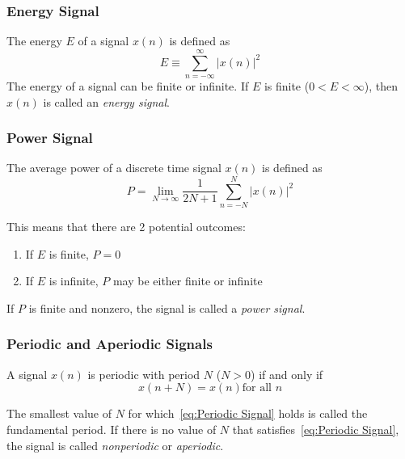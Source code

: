 \subsubsection{Energy Signal}\label{subsubsec:Energy Signal}
\begin{definition}\label{def:Energy Signal}
  The energy $E$ of a signal $x(n)$ is defined as
  \begin{equation}\label{eq:Energy Signal}
    E \equiv \sum_{n=-\infty}^{\infty} \lvert x(n) \rvert ^{2}
  \end{equation}
  The energy of a signal can be finite or infinite. If $E$ is finite ($0 < E < \infty$), then $x(n)$ is called an \emph{energy signal}.
\end{definition}

\subsubsection{Power Signal}\label{subsubsec:Power Signal}
\begin{definition}\label{def:Power Signal}
  The average power of a discrete time signal $x(n)$ is defined as
  \begin{equation}\label{eq:Power Signal}
    P = \lim_{N \rightarrow \infty} \frac{1}{2N+1} \sum_{n=-N}^{N} \lvert x(n) \rvert ^{2}
  \end{equation}

  This means that there are 2 potential outcomes:
  \begin{enumerate}[noitemsep]
  \item If $E$ is finite, $P=0$
  \item If $E$ is infinite, $P$ may be either finite or infinite
  \end{enumerate}

  If $P$ is finite and nonzero, the signal is called a \emph{power signal}.
\end{definition}

\subsubsection{Periodic and Aperiodic Signals}\label{subsubsec:Periodic Aperiodic Signals}
A signal $x(n)$ is periodic with period $N$ ($N>0$) if and only if
\begin{equation}\label{eq:Periodic Signal}
  x(n+N) = x(n) \text{for all } n
\end{equation}

The smallest value of $N$ for which~\eqref{eq:Periodic Signal} holds is called the fundamental period.
If there is no value of $N$ that satisfies~\eqref{eq:Periodic Signal}, the signal is called \emph{nonperiodic} or \emph{aperiodic}.

